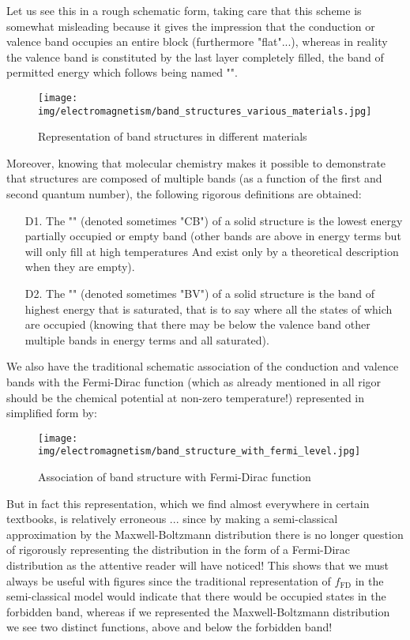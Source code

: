 	Let us see this in a rough schematic form, taking care that this scheme is somewhat misleading because it gives the impression that the conduction or valence band occupies an entire block (furthermore "flat"...), whereas in reality the valence band is constituted by the last layer completely filled, the band of permitted energy which follows being named "".
	\begin{figure}[H]
		\centering
		\texttt{[image: img/electromagnetism/band\_structures\_various\_materials.jpg]}
		\caption{Representation of band structures in different materials}
	\end{figure}
	Moreover, knowing that molecular chemistry makes it possible to demonstrate that structures are composed of multiple bands (as a function of the first and second quantum number), the following rigorous definitions are obtained:
	\begin{enumerate}
		\item[D1.] The "" (denoted sometimes "CB") of a solid structure is the lowest energy partially occupied or empty  band (other bands are above in energy terms but will only fill at high temperatures And exist only by a theoretical description when they are empty).

		\item[D2.] The "" (denoted sometimes "BV") of a solid structure is the band of highest energy that is saturated, that is to say where all the states of which are occupied (knowing that there may be below the valence band other multiple bands in energy terms and all saturated).
	\end{enumerate}
	We also have the traditional schematic association of the conduction and valence bands with the Fermi-Dirac function (which as already mentioned in all rigor should be the chemical potential at non-zero temperature!) represented in simplified form by:
	\begin{figure}[H]
		\centering
		\texttt{[image: img/electromagnetism/band\_structure\_with\_fermi\_level.jpg]}
		\caption{Association of band structure with Fermi-Dirac function}
	\end{figure}
	But in fact this representation, which we find almost everywhere in certain textbooks, is relatively erroneous ... since by making a semi-classical approximation by the Maxwell-Boltzmann distribution there is no longer question of rigorously representing the distribution in the form of a Fermi-Dirac distribution as the attentive reader will have noticed! This shows that we must always be useful with figures since the traditional representation of $f_{\text{FD}}$ in the semi-classical model would indicate that there would be occupied states in the forbidden band, whereas if we represented the Maxwell-Boltzmann distribution we see two distinct functions, above and below the forbidden band!
	
